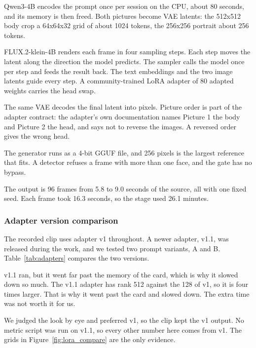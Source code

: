Qwen3-4B encodes the prompt once per session on the CPU, about 80 seconds, and its memory is then freed. Both pictures become VAE latents: the 512x512 body crop a 64x64x32 grid of about 1024 tokens, the 256x256 portrait about 256 tokens.

FLUX.2-klein-4B renders each frame in four sampling steps. Each step moves the latent along the direction the model predicts. The sampler calls the model once per step and feeds the result back. The text embeddings and the two image latents guide every step. A community-trained LoRA adapter of 80 adapted weights carries the head swap.

The same VAE decodes the final latent into pixels. Picture order is part of the adapter contract: the adapter's own documentation names Picture 1 the body and Picture 2 the head, and says not to reverse the images. A reversed order gives the wrong head.

The generator runs as a 4-bit GGUF file, and 256 pixels is the largest reference that fits. A detector refuses a frame with more than one face, and the gate has no bypass.

The output is 96 frames from 5.8 to 9.0 seconds of the source, all with one fixed seed. Each frame took 16.3 seconds, so the stage used 26.1 minutes.


\subsubsection{Adapter version comparison}
The recorded clip uses adapter v1 throughout. A newer adapter, v1.1, was released during the work, and we tested two prompt variants, A and B. Table~\ref{tab:adapters} compares the two versions.

v1.1 ran, but it went far past the memory of the card, which is why it slowed down so much. The v1.1 adapter has rank 512 against the 128 of v1, so it is four times larger. That is why it went past the card and slowed down. The extra time was not worth it for us.

We judged the look by eye and preferred v1, so the clip kept the v1 output. No metric script was run on v1.1, so every other number here comes from v1. The grids in Figure~\ref{fig:lora_compare} are the only evidence.

